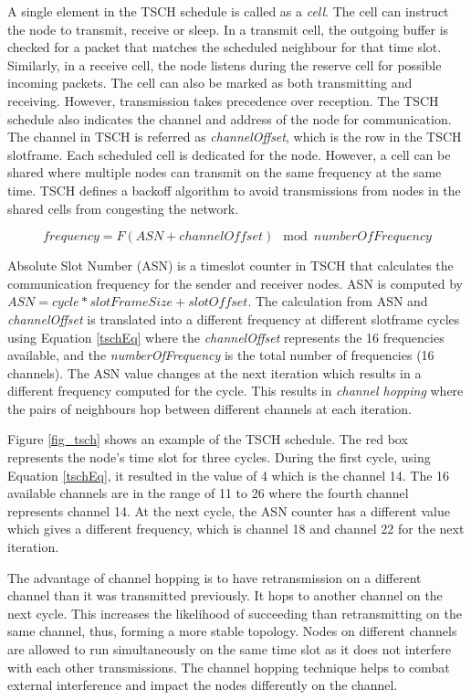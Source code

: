 A single element in the TSCH schedule is called as a \textit{cell}. The cell can instruct the node to transmit, receive or sleep. In a transmit cell, the outgoing buffer is checked for a packet that matches the scheduled neighbour for that time slot. Similarly, in a receive cell, the node listens during the reserve cell for possible incoming packets. The cell can also be marked as both transmitting and receiving. However, transmission takes precedence over reception. The TSCH schedule also indicates the channel and address of the node for communication. The channel in TSCH is referred as \textit{channelOffset}, which is the row in the TSCH slotframe. Each scheduled cell is dedicated for the node. However, a cell can be shared where multiple nodes can transmit on the same frequency at the same time. TSCH defines a backoff algorithm to avoid transmissions from nodes in the shared cells from congesting the network.

\begin{equation}
frequency = F {(ASN + channelOffset) \mod {numberOfFrequency}}
\label{tschEq}
\end{equation}

Absolute Slot Number (ASN) is a timeslot counter in TSCH that calculates the communication frequency for the sender and receiver nodes. ASN is computed by $ASN = cycle * slotFrameSize + slotOffset$. The calculation from ASN and \textit{channelOffset} is translated into a different frequency at different slotframe cycles using Equation \ref{tschEq} where the \textit{channelOffset} represents the 16 frequencies available, and the \textit{numberOfFrequency} is the total number of frequencies (16 channels). The ASN value changes at the next iteration which results in a different frequency computed for the cycle. This results in \textit{channel hopping} where the pairs of neighbours hop between different channels at each iteration.

Figure \ref{fig_tsch} shows an example of the TSCH schedule. The red box represents the node's time slot for three cycles. During the first cycle, using Equation \ref{tschEq}, it resulted in the value of 4 which is the channel 14. The 16 available channels are in the range of 11 to 26 where the fourth channel represents channel 14. At the next cycle, the ASN counter has a different value which gives a different frequency, which is channel 18 and channel 22 for the next iteration.

The advantage of channel hopping is to have retransmission on a different channel than it was transmitted previously. It hops to another channel on the next cycle. This increases the likelihood of succeeding than retransmitting on the same channel, thus, forming a more stable topology. Nodes on different channels are allowed to run simultaneously on the same time slot as it does not interfere with each other transmissions. The channel hopping technique helps to combat external interference and impact the nodes differently on the channel.

